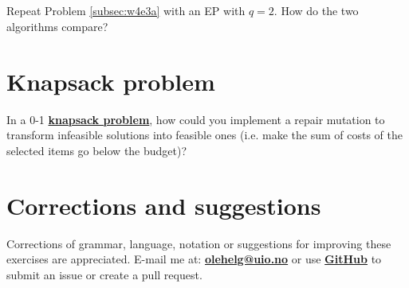 \documentclass{article}           %
\newcommand\marginsymbol[1][0pt]{%
  \tabto*{0cm}\makebox[\dimexpr-1cm-#1\relax][r]{$\mathbb{P}$}\tabto*{\TabPrevPos}}
\begin{document}
\subsection{\marginsymbol} %
Repeat Problem \ref{subsec:w4e3a} with an EP with \(q = 2\). How do the two algorithms compare?
\section{Knapsack problem}
In a 0-1 \href{https://en.wikipedia.org/wiki/Knapsack_problem}{\textbf{knapsack problem}}, how could you implement a repair mutation to transform infeasible solutions into feasible ones
(i.e. make the sum of costs of the selected items go below the budget)?

\section*{Corrections and suggestions}
Corrections of grammar, language, notation or suggestions for improving these exercises are appreciated.
E-mail me at: \href{mailto:olehelg@uio.no}{\textbf{olehelg@uio.no}} or use
\href{https://github.com/olehermanse/INF3490-AI_Machine_Learning}{\textbf{GitHub}}
to submit an issue or create a pull request.
\end{document}
